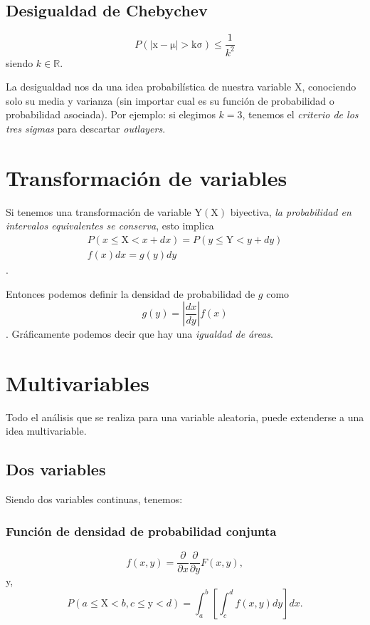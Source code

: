 \documentclass[openany]{book}
\begin{document}
\subsection{Desigualdad de Chebychev}
\begin{equation}
  \label{eq:Chebychev}
  P(\mathrm{|\mathrm{x}-\mu|>k\sigma})\leq\frac{1}{k^2}
\end{equation}
siendo $k\in\mathbb{R}$.
\par La desigualdad nos da una idea probabilística de nuestra variable $\mathrm{X}$, conociendo solo su media y varianza (sin importar cual es su función de probabilidad o probabilidad asociada). Por ejemplo: si elegimos $k=3$, tenemos el \emph{criterio de los tres sigmas} para descartar \emph{outlayers}.

\section{Transformación de variables}
Si tenemos una transformación de variable $\mathrm{Y(X)}$ biyectiva, \emph{la probabilidad en intervalos equivalentes se conserva}, esto implica
\begin{gather*}
  P(x\leq\mathrm{X}<x+dx)=P(y\leq\mathrm{Y}<y+dy)\\
  f(x)dx=g(y)dy
\end{gather*}.
\par Entonces podemos definir la densidad de probabilidad de $g$ como
\begin{equation}
  \label{eq:gdy}
  g(y)=\left|\frac{dx}{dy}\right|f(x)
\end{equation}.
Gráficamente podemos decir que hay una \emph{igualdad de áreas}.

\section{Multivariables}
Todo el análisis que se realiza para una variable aleatoria, puede extenderse a una idea multivariable.

\subsection{Dos variables}
Siendo dos variables continuas, tenemos:
\subsubsection*{Función de densidad de probabilidad conjunta}
\begin{equation}
  f(x,y)=\frac{\partial }{\partial x}\frac{\partial }{\partial y}F(x,y),
  \label{eq:f_xy}
\end{equation}
y,
\begin{equation}
  P(a\leq\mathrm{X}<b,c\leq\mathrm{y}<d)=\int_{a}^{b}\left[\int_{c}^{d}f(x,y)dy\right]dx.
\end{equation}
\end{document}
